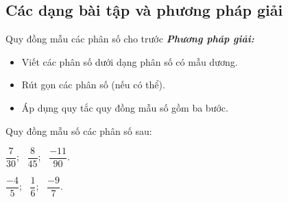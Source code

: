 \subsection{Các dạng bài tập và phương pháp giải}	
\begin{dang}{Quy đồng mẫu các phân số cho trước}
\textbf{\textit{Phương pháp giải:}}
\begin{itemize}
	\item Viết các phân số dưới dạng phân số có mẫu dương.
	\item Rút gọn các phân số (nếu có thể).
	\item Áp dụng quy tắc quy đồng mẫu số gồm ba bước.
\end{itemize}
\end{dang}
\begin{vd}%
Quy đồng mẫu số các phân số sau:
\begin{listEX}[2]
	\item $ \dfrac{7}{30} $; \ $ \dfrac{8}{45} $; \ $ \dfrac{-11}{90} $.
	\item $ \dfrac{-4}{5} $; \ $ \dfrac{1}{6} $; \ $ \dfrac{-9}{7} $.
\end{listEX}
\end{vd}
